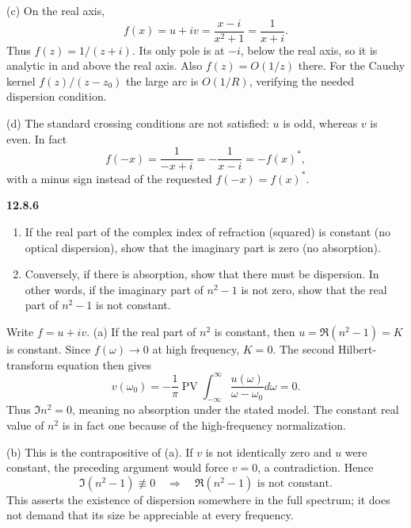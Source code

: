 (c) On the real axis,
\[
f(x)=u+iv=\frac{x-i}{x^2+1}=\frac1{x+i}.
\]
Thus $\boxed{f(z)=1/(z+i)}$. Its only pole is at $-i$, below the
real axis, so it is analytic in and above the real axis. Also
$f(z)=O(1/z)$ there. For the Cauchy kernel $f(z)/(z-z_0)$ the large
arc is $O(1/R)$, verifying the needed dispersion condition.

(d) The standard crossing conditions are not satisfied: $u$ is odd,
whereas $v$ is even. In fact
\[
f(-x)=\frac1{-x+i}=-\frac1{x-i}=-f(x)^*,
\]
with a minus sign instead of the requested $f(-x)=f(x)^*$.

\par\bigskip
\noindent\textbf{12.8.6}\quad
{}
\begin{enumerate}
\item[(a)] If the real part of the complex index of refraction (squared) is
  constant (no optical dispersion), show that the imaginary part is zero (no
  absorption).
\item[(b)] Conversely, if there is absorption, show that there must be
  dispersion. In other words, if the imaginary part of $n^{2}-1$ is not
  zero, show that the real part of $n^{2}-1$ is not constant.
\end{enumerate}
\solution
{}
Write $f=u+iv$. (a) If the real part of $n^2$ is constant, then
$u=\Re(n^2-1)=K$ is constant. Since $f(\omega)\to0$ at high frequency,
$K=0$. The second Hilbert-transform equation then gives
\[
v(\omega_0)=-\frac1\pi\operatorname{PV}\int_{-\infty}^{\infty}
\frac{u(\omega)}{\omega-\omega_0}d\omega=0.
\]
Thus $\boxed{\Im n^2=0}$, meaning no absorption under the stated model.
The constant real value of $n^2$ is in fact one because of the
high-frequency normalization.

(b) This is the contrapositive of (a). If $v$ is not identically zero
and $u$ were constant, the preceding argument would force $v=0$, a
contradiction. Hence
\[
\boxed{\Im(n^2-1)\not\equiv0\quad\Longrightarrow\quad
\Re(n^2-1)\text{ is not constant}}.
\]
This asserts the existence of dispersion somewhere in the full spectrum;
it does not demand that its size be appreciable at every frequency.

